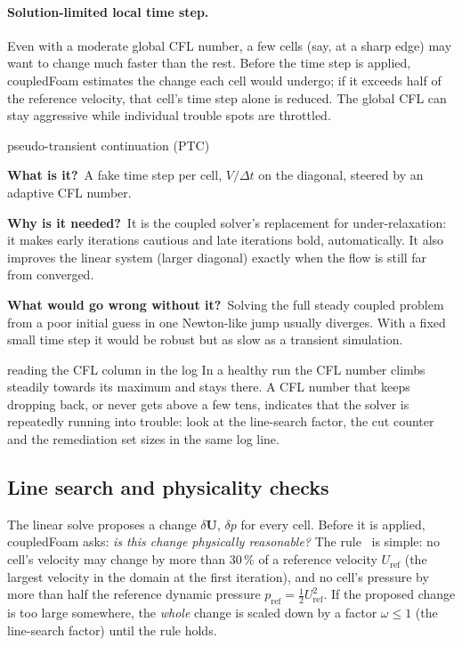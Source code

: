 \documentclass[11pt,a4paper]{article}
\newcommand{\vect}[1]{\mathbf{#1}}
\newcommand{\Uv}{\vect{U}}
\newcommand{\bbwhat}{\par\smallskip\noindent\textbf{What is it?}\ }
\newcommand{\bbwhy}{\par\smallskip\noindent\textbf{Why is it needed?}\ }
\newcommand{\bbwithout}{\par\smallskip\noindent\textbf{What would go wrong
  without it?}\ }
\begin{document}
\paragraph{Solution-limited local time step.}
Even with a moderate global CFL number, a few cells (say, at a sharp edge)
may want to change much faster than the rest. Before the time step is
applied, coupledFoam estimates the change each cell would undergo; if it
exceeds half of the reference velocity, that cell's time step alone is
reduced. The global CFL can stay aggressive while individual trouble spots
are throttled.

\begin{bblock}{pseudo-transient continuation (PTC)}
\bbwhat A fake time step per cell, $V/\Delta t$ on the diagonal, steered by
an adaptive CFL number.
\bbwhy It is the coupled solver's replacement for under-relaxation: it
makes early iterations cautious and late iterations bold, automatically. It
also improves the linear system (larger diagonal) exactly when the flow is
still far from converged.
\bbwithout Solving the full steady coupled problem from a poor initial guess
in one Newton-like jump usually diverges. With a fixed small time step it
would be robust but as slow as a transient simulation.
\end{bblock}

\begin{whyitmatters}{reading the CFL column in the log}
  In a healthy run the CFL number climbs steadily towards its maximum and
  stays there. A CFL number that keeps dropping back, or never gets
  above a few tens, indicates that the solver is repeatedly running into
  trouble: look at the line-search factor, the cut counter and the
  remediation set sizes in the same log line.
\end{whyitmatters}

\subsection{Line search and physicality checks}\label{sec:ls}

The linear solve proposes a change $\delta\Uv$, $\delta p$ for every cell.
Before it is applied, coupledFoam asks: \emph{is this change physically
reasonable?} The rule~\cite{Ceze2013AIAA} is simple: no cell's velocity may
change by more than 30\,\% of a reference velocity $U_{\mathrm{ref}}$ (the
largest velocity in the domain at the first iteration), and no cell's
pressure by more than half the reference dynamic pressure
$p_{\mathrm{ref}}=\tfrac12U_{\mathrm{ref}}^2$. If the proposed change is too
large somewhere, the \emph{whole} change is scaled down by a factor
$\omega\le1$ (the line-search factor) until the rule holds.
\end{document}
